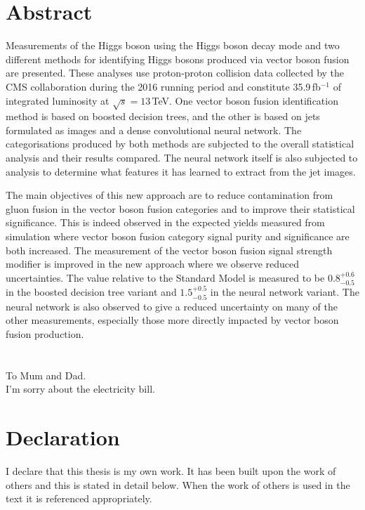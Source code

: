 

\chapter*{\centering Abstract}
Measurements of the Higgs boson using the \Hgg Higgs boson decay mode and two different methods for identifying Higgs bosons produced via vector boson fusion are presented.
These analyses use proton-proton collision data collected by the CMS collaboration during the 2016 running period and constitute 35.9\,fb$^{-1}$ of integrated luminosity at $\sqrt{s}=13$\,TeV.
One vector boson fusion identification method is based on boosted decision trees, and the other is based on jets formulated as images and a dense convolutional neural network. 
The categorisations produced by both methods are subjected to the overall \Hgg statistical analysis and their results compared.
The neural network itself is also subjected to analysis to determine what features it has learned to extract from the jet images.

The main objectives of this new approach are to reduce contamination from gluon fusion in the vector boson fusion categories and to improve their statistical significance. 
This is indeed observed in the expected yields measured from simulation where vector boson fusion category signal purity and significance are both increased.
The measurement of the vector boson fusion signal strength modifier is improved in the new approach where we observe reduced uncertainties. 
The value relative to the Standard Model is measured to be $0.8^{+0.6}_{-0.5}$ in the boosted decision tree variant and $1.5^{+0.5}_{-0.5}$ in the neural network variant. 
The neural network is also observed to give a reduced uncertainty on many of the other measurements, especially those more directly impacted by vector boson fusion production.


\chapter*{\centering }%
\begin{center}
    \thispagestyle{empty}
    To Mum and Dad. \\
    I'm sorry about the electricity bill.
\end{center}


\chapter*{\centering Declaration}
I declare that this thesis is my own work. It has been built upon the work of others and this is stated in detail below. 
When the work of others is used in the text it is referenced appropriately.

